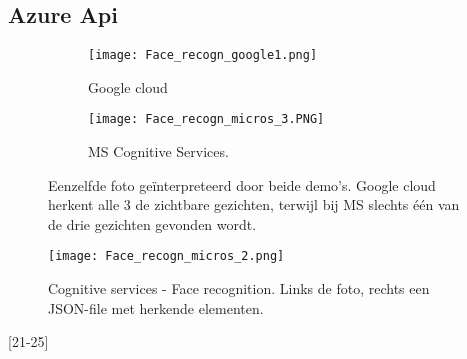 \subsection{Azure Api }

\begin{figure}[h]
	\centering
	\begin{subfigure}{0.45\textwidth}
		\centering
		\texttt{[image: Face\_recogn\_google1.png]}
		\caption{Google cloud}
		\label{fig:sub1}
	\end{subfigure}%
	\begin{subfigure}{0.45\textwidth}
		\centering
		\texttt{[image: Face\_recogn\_micros\_3.PNG]}
		\caption{MS Cognitive Services.}
		\label{fig:sub2}
	\end{subfigure}
	\caption{Eenzelfde foto geïnterpreteerd door beide demo's. Google cloud herkent alle 3 de zichtbare gezichten, terwijl bij MS slechts één van de drie gezichten gevonden wordt.}
	\label{fig:test}
\end{figure}

\begin{figure}[h]
	\texttt{[image: Face\_recogn\_micros\_2.png]}
	\caption{Cognitive services - Face recognition. Links de foto, rechts een JSON-file met herkende elementen.}
	\label{fig:cognitive2}
\end{figure}

[21-25]

